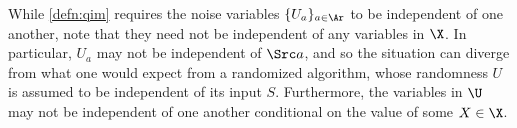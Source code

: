 While \cref{defn:qim} requires the noise variables $\{ U_a \}_{a \in \Ar}$ to be independent of one another, note that they need not be independent of any variables in $\X$.
%
In particular, $U_a$ may not be independent of $\Src a$,
and so 
the situation can diverge from what one would expect from a randomized algorithm, whose
randomness $U$ is assumed to be independent of its input 
$S$. 
Furthermore, the variables in $\U$ may not be independent of one another conditional on the value of some $X \in \X$. 
